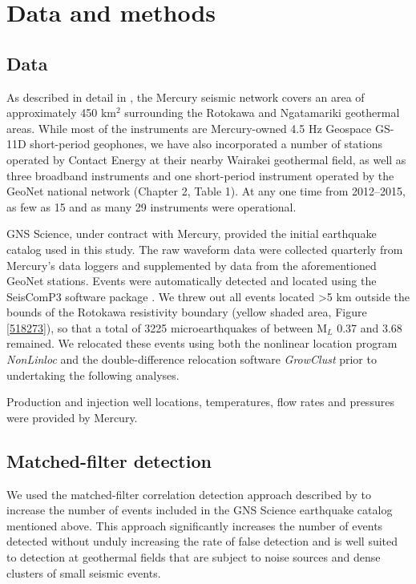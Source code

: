 \section{Data and methods}
\subsection{Data} \label{Data}
As described in detail in \citep[][submitted]{j2019}, the Mercury seismic network covers an area of approximately 450 km$^2$ surrounding the Rotokawa and Ngatamariki geothermal areas. While most of the instruments are Mercury-owned 4.5 Hz Geospace GS-11D short-period geophones, we have also incorporated a number of stations operated by Contact Energy at their nearby Wairakei geothermal field, as well as three broadband instruments and one short-period instrument operated by the GeoNet national network (Chapter 2, Table 1). At any one time from 2012--2015, as few as 15 and as many 29 instruments were operational.

GNS Science, under contract with Mercury, provided the initial earthquake catalog used in this study. The raw waveform data were collected quarterly from Mercury's data loggers and supplemented by data from the aforementioned GeoNet stations. Events were automatically detected and located using the SeisComP3 software package \citep{Weber2007}. We threw out all events located \textgreater5 km outside the bounds of the Rotokawa resistivity boundary (yellow shaded area, Figure \ref{518273}), so that a total of 3225 microearthquakes of between M$_L$ 0.37 and 3.68 remained. We relocated these events using both the nonlinear location program \textit{NonLinloc} \citep{Lomax_2014} and the double-difference relocation software \textit{GrowClust} \citet{Trugman_2017} prior to undertaking the following analyses.

Production and injection well locations, temperatures, flow rates and pressures were provided by Mercury.

\subsection{Matched-filter detection}
We used the matched-filter correlation detection approach described by \citep{Chamberlain_2017,j2019} to increase the number of events included in the GNS Science earthquake catalog mentioned above. This approach significantly increases the number of events detected without unduly increasing the rate of false detection and is well suited to detection at geothermal fields that are subject to noise sources and dense clusters of small seismic events.

